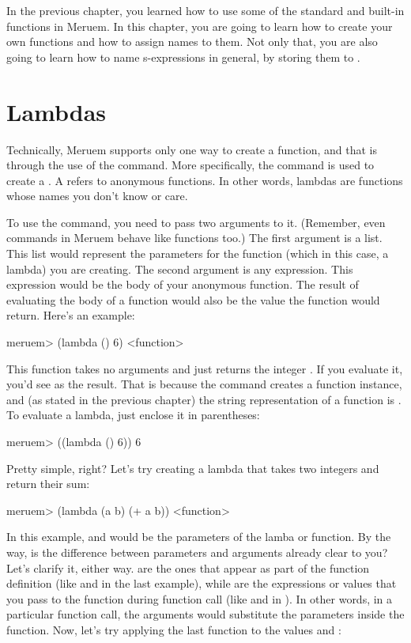 In the previous chapter, you learned how to use some of the standard and built-in functions in Meruem. In this chapter, you are going to learn how to create your own functions and how to assign names to them. Not only that, you are also going to learn how to name s-expressions in general, by storing them to .

\section{Lambdas}
Technically, Meruem supports only one way to create a function, and that is through the use of the  command. More specifically, the  command is used to create a . A  refers to anonymous functions. In other words, lambdas are functions whose names you don't know or care. 

To use the  command, you need to pass two arguments to it. (Remember, even commands in Meruem behave like functions too.) The first argument is a list. This list would represent the parameters for the function (which in this case, a lambda) you are creating. The second argument is any expression. This expression would be the body of your anonymous function. The result of evaluating the body of a function would also be the value the function would return. Here's an example:

\begin{REPL}
meruem> (lambda () 6)
<function>
\end{REPL}

This function takes no arguments and just returns the integer . If you evaluate it, you'd see  as the result. That is because the  command creates a function instance, and (as stated in the previous chapter) the string representation of a function is . To evaluate a lambda, just enclose it in parentheses:

\begin{REPL}
meruem> ((lambda () 6))
6
\end{REPL}

Pretty simple, right? Let's try creating a lambda that takes two integers and return their sum:

\begin{REPL}
meruem> (lambda (a b) (+ a b)) 
<function>
\end{REPL}

In this example,  and  would be the parameters of the lamba or function. By the way, is the difference between parameters and arguments already clear to you? Let's clarify it, either way.  are the ones that appear as part of the function definition (like  and  in the last example), while  are the expressions or values that you pass to the function during function call (like  and  in ). In other words, in a particular function call, the arguments would substitute the parameters inside the function. Now, let's try applying the last function to the values  and :

